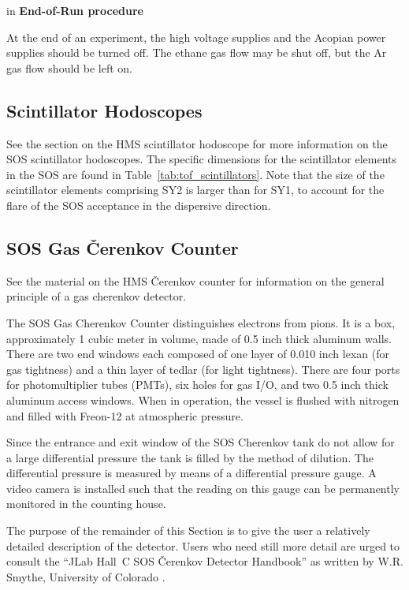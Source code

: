\begin{obsolete}
 in
{\bf End-of-Run procedure}

At the end of an experiment, the high voltage supplies and the Acopian
power supplies should be turned off.  The ethane gas flow may be shut
off, but the Ar gas flow should be left on.


\subsection{Scintillator Hodoscopes }

See the section on the HMS scintillator hodoscope for more information on the SOS scintillator hodoscopes.  The specific dimensions for the scintillator elements in the SOS
are found in Table~\ref{tab:tof_scintillators}.
Note that the size of the scintillator elements
comprising SY2 is larger than for SY1, to account for the flare of the
SOS acceptance in the dispersive direction.

\subsection{SOS Gas \v{C}erenkov Counter}

See the material on the HMS \v{C}erenkov counter for information on the general 
principle of a gas cherenkov detector.

The SOS Gas Cherenkov Counter distinguishes electrons from pions.  It
is a box, approximately 1 cubic meter in volume, made of 0.5 inch
thick aluminum walls.  There are two end windows each composed of one
layer of 0.010 inch lexan (for gas tightness) and a thin layer of
tedlar (for light tightness).  There are four ports for
photomultiplier tubes (PMTs), six holes for gas I/O, and two 0.5 inch
thick aluminum access windows.  When in operation, the vessel is
flushed with nitrogen and filled with Freon-12 at atmospheric
pressure.

Since the entrance and exit window of the
SOS Cherenkov tank do not allow for a large differential pressure the
tank is filled by the method of dilution.
The differential pressure is measured by means of a differential
pressure gauge.
A video camera is installed such that the reading on this gauge can be
permanently monitored in the counting house.

	The purpose of the remainder of this Section is to give the user
a relatively detailed description of the detector.  Users who need still more
detail are urged to consult the ``JLab Hall~C SOS \v{C}erenkov
Detector Handbook'' as written by W.R. Smythe, University of Colorado
\cite{bi:Smythe}.


\end{obsolete}
